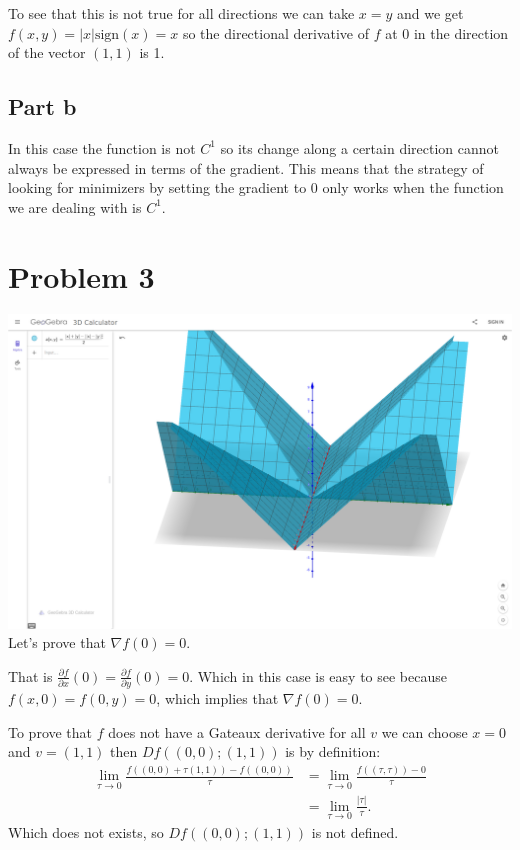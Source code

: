 \documentclass{article}
\begin{document}
To see that this is not true for all directions we can take $x=y$ and we get
$f(x,y)=|x|\text{sign}(x)=x$ so the directional derivative of $f$ at 0 in the
direction of the vector $(1,1)$ is 1.
\subsection{Part b}
In this case the function is not $C^1$ so its change along a
certain direction cannot always be expressed in terms of the
gradient. This means that the strategy of looking for minimizers by setting the
gradient to 0 only works when the function we are dealing with is $C^1$.
\section{Problem 3}
\includegraphics[width=\textwidth]{min.png}
Let's prove that $\nabla f(0)=0$.

That is $\frac{\partial f}{\partial x}(0)=\frac{\partial f}{\partial y}(0)=0$.
Which in this case is easy to see because $f(x,0)=f(0,y)=0$, which implies that
$\nabla f(0)=0$.

To prove that $f$ does not have a Gateaux derivative for all $v$ we can choose
$x=0$ and $v=(1,1)$ then $Df((0,0);(1,1))$ is by definition:
\begin{align*}
\lim_{\tau \to 0} \frac{f((0,0)+\tau(1,1))-f((0,0))}{\tau}
&= \lim_{\tau \to 0} \frac{f((\tau,\tau))-0}{\tau}\\
&=\lim_{\tau \to 0} \frac{|\tau|}{\tau}.
\end{align*}
Which does not exists, so $Df((0,0);(1,1))$ is not defined.
\end{document}
